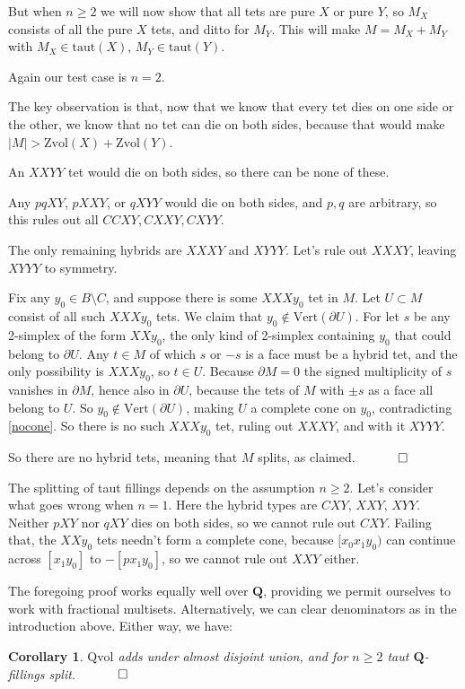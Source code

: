\documentclass[12pt]{article}
\newtheorem{corollary}{Corollary}
\newcommand{\proofend}{$\quad \qed$}
\def\QQ{\mathbf{Q}}
\def\del{\partial}
\newcommand{\kw}{\mathrm}
\newcommand{\vertices}{\kw{Vert}}
\newcommand{\taut}{\kw{taut}}
\newcommand{\Zvol}{\kw{Zvol}}
\newcommand{\Qvol}{\kw{Qvol}}
\begin{document}
But when $n \geq 2$ we will now show that all tets are pure $X$ or pure $Y$,
so $M_X$ consists of all the pure $X$ tets, and ditto for $M_Y$.
This will make
$M = M_X + M_Y$ with $M_X \in \taut(X)$, $M_Y \in \taut(Y)$.

Again our test case is $n=2$.

The key observation is that, now that we know that every tet dies on
one side or the other, we know that no tet can die on both sides,
because that would make $|M| > \Zvol(X) + \Zvol(Y)$.

An $XXYY$ tet would die on both sides, so there can be none of these.

Any $pqXY$, $pXXY$, or $qXYY$ would die on both sides, and $p,q$ are arbitrary,
so this rules out all $CCXY,CXXY,CXYY$.

The only remaining hybrids are $XXXY$ and $XYYY$.
Let's rule out $XXXY$, leaving $XYYY$ to symmetry.

Fix any $y_0 \in B \setminus C$, and suppose there is
some $XXXy_0$ tet in $M$.
Let $U \subset M$ consist of all such $XXXy_0$ tets.
We claim that $y_0 \notin \vertices(\del U)$.
For let $s$ be any 2-simplex of the form $XXy_0$,
the only kind of 2-simplex containing $y_0$ that could belong
to $\del U$.
Any $t \in M$ of which $s$ or $-s$ is a face must be a hybrid tet,
and the only possibility is $XXXy_0$, so $t \in U$.
Because $\del M = 0$ the signed multiplicity of $s$
vanishes in $\del M$,
hence also in $\del U$,
because the tets of $M$ with $\pm s$ as a face all belong to $U$.
So $y_0 \notin \vertices(\del U)$,
making $U$ a complete cone on $y_0$,
contradicting \ref{nocone}.
So there is no such $XXXy_0$ tet, ruling out $XXXY$,
and with it $XYYY$.

So there are no hybrid tets, meaning that $M$ splits, as claimed.
\proofend

The splitting of taut fillings depends on the assumption $n\geq 2$.
Let's consider what goes wrong when $n=1$.
Here the hybrid types are $CXY$, $XXY$, $XYY$.
Neither $pXY$ nor $qXY$ dies on both sides, so we cannot rule out $CXY$.
Failing that, the $XXy_0$ tets needn't form a complete cone,
because $[x_0x_1y_0)$ can continue across $[x_1 y_0]$ to $-[p x_1 y_0]$,
so we cannot rule out $XXY$ either.

The foregoing proof works equally well over $\QQ$, providing we
permit ourselves to work with fractional multisets.
Alternatively, we can clear denominators as in the introduction
above.
Either way, we have:

\begin{corollary} \label{cor1}
$\Qvol$ adds under almost disjoint union,
and for $n \geq 2$
taut $\QQ$-fillings split.
\proofend
\end{corollary}
\end{document}
